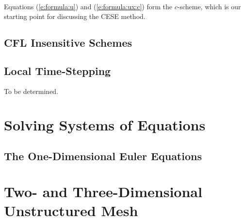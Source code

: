 \documentclass{turgon}
\begin{document}
Equations (\ref{e:formula:u}) and (\ref{e:formula:ux:c}) form the $c$-scheme,
which is our starting point for discussing the CESE method.

\section{CFL Insensitive Schemes}
\label{s:ctau}

\section{Local Time-Stepping}
\label{s:lts}

To be determined.

\chapter{Solving Systems of Equations}
\label{c:system_eqn}

\section{The One-Dimensional Euler Equations}

\chapter{Two- and Three-Dimensional Unstructured Mesh}
\label{c:ustmesh}

\clearpage
{}


\end{document}

